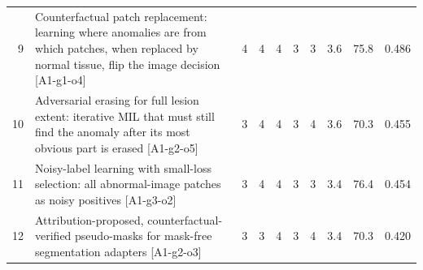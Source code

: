 \documentclass[11pt,a4paper]{article}
\begin{document}
{\begin{longtable}{@{}r >{\raggedright\arraybackslash}p{8.4cm} ccccc c r r@{}}
9 & Counterfactual patch replacement: learning where anomalies are from which patches, when replaced by normal tissue, flip the image decision {\footnotesize\color{muted}[A1-g1-o4]} & 4 & 4 & 4 & 3 & 3 & 3.6 & 75.8 & 0.486\\
10 & Adversarial erasing for full lesion extent: iterative MIL that must still find the anomaly after its most obvious part is erased {\footnotesize\color{muted}[A1-g2-o5]} & 3 & 4 & 4 & 3 & 4 & 3.6 & 70.3 & 0.455\\
11 & Noisy-label learning with small-loss selection: all abnormal-image patches as noisy positives {\footnotesize\color{muted}[A1-g3-o2]} & 3 & 4 & 4 & 3 & 3 & 3.4 & 76.4 & 0.454\\
12 & Attribution-proposed, counterfactual-verified pseudo-masks for mask-free segmentation adapters {\footnotesize\color{muted}[A1-g2-o3]} & 3 & 3 & 4 & 3 & 4 & 3.4 & 70.3 & 0.420\\
\bottomrule
\end{longtable}}
\end{document}
